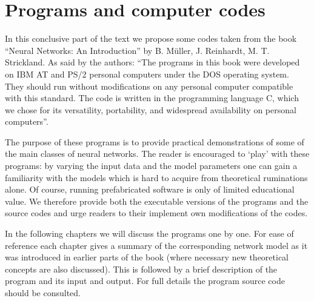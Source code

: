 \chapter{Programs and computer codes}
In this conclusive part of the text we propose some codes taken from the book ``Neural Networks: An Introduction'' by B. Müller, J. Reinhardt, M. T. Strickland. As said by the authors: ``The programs in this book were developed on IBM AT and PS/2 personal computers under the DOS operating system. They should run without modifications on any personal computer compatible with this standard. \textelp{} The code is written in the programming language C, which we chose for its versatility, portability, and widespread availability on personal computers''.

The purpose of these programs is to provide practical demonstrations of some of the main classes of neural networks. The reader is encouraged to `play' with these programs: by varying the input data and the model parameters one can gain a familiarity with the models which is hard to acquire from theoretical ruminations alone. Of course, running prefabricated software is only of limited educational value. We therefore provide both the executable versions of the programs and the source codes and urge readers to their implement own modifications of the codes.

In the following chapters we will discuss the programs one by one. For ease of reference each chapter gives a summary of the corresponding network model as it was introduced in earlier parts of the book (where necessary new theoretical concepts are also discussed). This is followed by a brief description of the program and its input and output. For full details the program source code should be consulted.

